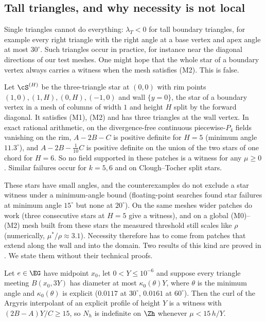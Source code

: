 \subsection{Tall triangles, and why necessity is not local}\label{sec:penalty:local}
Single triangles cannot do everything: $\lambda_T<0$ for tall boundary triangles, for example every right triangle with the right angle at a base vertex and apex angle at most $30^\circ$. Such triangles occur in practice, for instance near the diagonal directions of our test meshes. One might hope that the whole star of a boundary vertex always carries a witness when the mesh satisfies (M2). This is false.

\begin{proposition}\label{prop:counter}
Let $\cS^{(H)}$ be the three-triangle star at $(0,0)$ with rim points $(1,0),(1,H),(0,H),(-1,0)$ and wall $\{y=0\}$, the star of a boundary vertex in a mesh of columns of width $1$ and height $H$ split by the forward diagonal. It satisfies (M1), (M2) and has three triangles at the wall vertex. In exact rational arithmetic, on the divergence-free continuous piecewise-$P_4$ fields vanishing on the rim, $A-2B-C$ is positive definite for $H=5$ (minimum angle $11.3^\circ$), and $A-2B-\frac1{10}C$ is positive definite on the union of the two stars of one chord for $H=6$. So no field supported in these patches is a witness for any $\mu\ge0$. Similar failures occur for $k=5,6$ and on Clough--Tocher split stars.
\end{proposition}

These stars have small angles, and the counterexamples do not exclude a star witness under a minimum-angle bound (floating-point searches found star failures at minimum angle $15^\circ$ but none at $20^\circ$). On the same meshes wider patches do work (three consecutive stars at $H=5$ give a witness), and on a global (M0)--(M2) mesh built from these stars the measured threshold still scales like $\rho$ (numerically, $\mu^\ast/\rho\approx3.1$). Necessity therefore has to come from patches that extend along the wall and into the domain. Two results of this kind are proved in \cite{PadhiExt}. We state them without their technical proofs.

\begin{theorem}\label{thm:pbA}
Let $e\in\EG$ have midpoint $x_0$, let $0<Y\le10^{-6}$ and suppose every triangle meeting $B(x_0,3Y)$ has diameter at most $\kappa_0(\theta)Y$, where $\theta$ is the minimum angle and $\kappa_0(\theta)$ is explicit ($0.0117$ at $30^\circ$, $0.0161$ at $60^\circ$). Then the curl of the Argyris interpolant of an explicit profile of height $Y$ is a witness with $(2B-A)Y/C\ge15$, so $N_h$ is indefinite on $\Zh$ whenever $\mu<15\,h/Y$.
\end{theorem}

